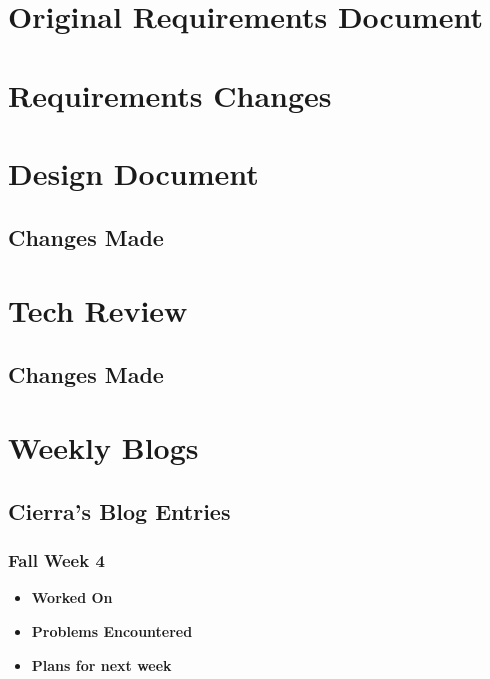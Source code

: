 \documentclass[compsoc,draftclsnofoot,onecolumn,10pt]{IEEEtran}
\begin{document}
\section{Original Requirements Document}

% 

\section{Requirements Changes}

\section{Design Document}

    \subsection{Changes Made}

\section{Tech Review}

    \subsection{Changes Made}

\section{Weekly Blogs}

\subsection{Cierra's Blog Entries}

\subsubsection{Fall Week 4}
\begin{itemize}
    \item {\textbf{Worked On}}
    \begin{itemize}

    \end{itemize}

    \item {\textbf{Problems Encountered}}
    \begin{itemize}

    \end{itemize}

    \item{\textbf{Plans for next week}}
    \begin{itemize}

    \end{itemize}

\end{itemize}
\end{document}

